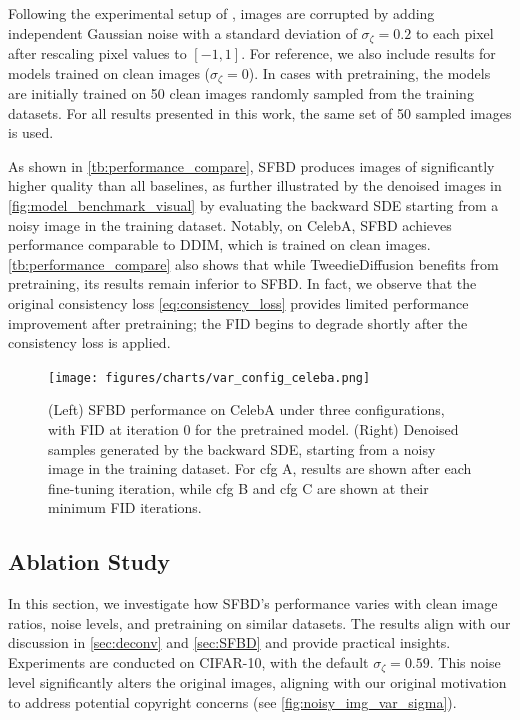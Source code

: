 Following the experimental setup of \citet{BaiWCS2024}, images are corrupted by adding independent Gaussian noise with a standard deviation of  $\sigma_\zeta = 0.2$  to each pixel after rescaling pixel values to $[-1, 1]$. For reference, we also include results for models trained on clean images ($\sigma_\zeta = 0$). In cases with pretraining, the models are initially trained on 50 clean images randomly sampled from the training datasets. For all results presented in this work, the same set of 50 sampled images is used.


As shown in \cref{tb:performance_compare}, SFBD produces images of significantly higher quality than all baselines, as further illustrated by the denoised images in \cref{fig:model_benchmark_visual} by evaluating the backward SDE starting from a noisy image in the training dataset. Notably, on CelebA, SFBD achieves performance comparable to DDIM, which is trained on clean images. \cref{tb:performance_compare} also shows that while TweedieDiffusion benefits from pretraining, its results remain inferior to SFBD. In fact, we observe that the original consistency loss  \eqref{eq:consistency_loss} provides limited performance improvement after pretraining; the FID begins to degrade shortly after the consistency loss is applied.
\begin{figure*}[t!]
	\centering
	\texttt{[image: figures/charts/var\_config\_celeba.png]}~~~~
	\caption{(Left) SFBD performance on CelebA under three configurations, with FID at iteration 0 for the pretrained model. (Right) Denoised samples generated by the backward SDE, starting from a noisy image in the training dataset. For cfg A, results are shown after each fine-tuning iteration, while cfg B and cfg C are shown at their minimum FID iterations.}
	\label{fig:var_config_celeba}
\end{figure*}

\subsection{Ablation Study}
\label{sec:exp:ablation}
In this section, we investigate how SFBD's performance varies with clean image ratios, noise levels, and pretraining on similar datasets. The results align with our discussion in \cref{sec:deconv} and \cref{sec:SFBD} and provide practical insights. Experiments are conducted on CIFAR-10, with the default $\sigma_\zeta = 0.59$. This noise level significantly alters the original images, aligning with our original motivation to address potential copyright concerns (see \cref{fig:noisy_img_var_sigma}). 


